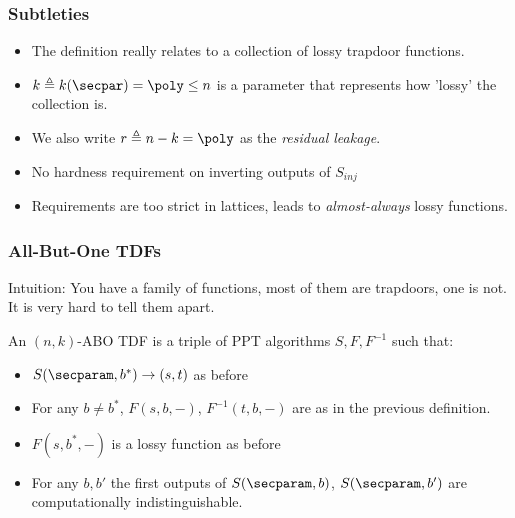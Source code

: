 \documentclass{beamer}
\begin{document}
\begin{frame}
    \frametitle{Subtleties}
    \begin{itemize}
        \item The definition really relates to a collection of lossy trapdoor functions.
        \item $k \triangleq k(\secpar) = \poly \leq n$ is a parameter that represents how 'lossy' the collection is.
        \item We also write $r \triangleq n-k = \poly$ as the \textit{residual leakage}.
        \item No hardness requirement on inverting outputs of $S_{inj}$
        \item Requirements are too strict in lattices, leads to \textit{almost-always} lossy functions.
    \end{itemize}
\end{frame}

\begin{frame}
    \frametitle{All-But-One TDFs}
    Intuition: You have a family of functions, most of them are trapdoors, one is not. It 
    is very hard to tell them apart.
    \begin{definition}
        An $(n, k)$-ABO TDF is a triple of PPT algorithms $S, F, F^{-1}$ such that:
        \begin{itemize}
            \item $S(\secparam, b^*) \rightarrow (s, t)$ as before
            \item For any $b \neq b^*$, $F(s, b, {-})$, $F^{-1}(t, b, {-})$ are as in the previous definition.
            \item $F(s, b^*, {-})$ is a lossy function as before
            \item For any $b,b'$ the first outputs of $S(\secparam, b)$, $S(\secparam, b')$ are computationally indistinguishable.
        \end{itemize}
    \end{definition}
\end{frame}
\end{document}
